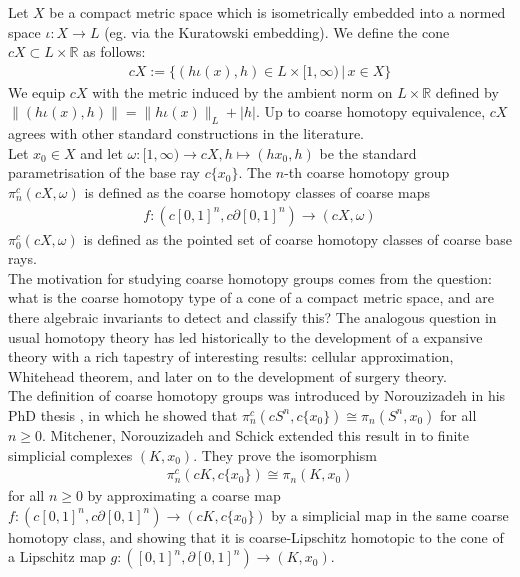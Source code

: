 \documentclass[a4paper,11pt]{article}
\theoremstyle{definition}
\theoremstyle{plain}
\theoremstyle{remark}
\begin{document}
Let $X$ be a compact metric space which is isometrically embedded into a normed space $\iota: X\rightarrow L$ (eg. via the Kuratowski embedding). We define the cone $cX \subset L \times \mathbb{R}$ as follows:
\begin{align*}
cX:= \{(h\iota(x),h)\in L \times [1,\infty) \,|\, x\in X\}
\end{align*}
We equip $cX$ with the metric induced by the ambient norm on $L\times \mathbb{R}$ defined by $\|(h\iota(x),h)\| = \|h\iota(x)\|_{L}+ |h|$.  Up to coarse homotopy equivalence, $cX$ agrees with other standard constructions in the literature. \\

Let $x_0\in X$ and let $\omega:[1,\infty)\rightarrow cX, h\mapsto  (hx_0,h)$ be the standard parametrisation of the base ray $c\{x_0\}$. The $n$-th coarse homotopy group $\pi_{n}^{c}(cX,\omega)$ is defined as the coarse homotopy classes of coarse maps 
\begin{align*}
f: (c[0,1]^n,c\partial [0,1]^n) \rightarrow (cX,\omega)
\end{align*}
$\pi_{0}^{c}(cX,\omega)$ is defined as the pointed set of coarse homotopy classes of coarse base rays.\\

The motivation for studying coarse homotopy groups comes from the question: what is the coarse homotopy type of a cone of a compact metric space, and are there algebraic invariants to detect and classify this? The analogous question in usual homotopy theory has led historically to the development of a expansive theory with a rich tapestry of interesting results: cellular approximation, Whitehead theorem, and later on to the development of surgery theory.\\

The definition of coarse homotopy groups was introduced by Norouzizadeh in his PhD thesis \cite{norouzizadeh2010some}, in which he showed that $\pi_{n}^{c}(cS^n,c\{x_0\}) \cong \pi_{n}(S^n,x_0)$ for all $n\geq 0$. Mitchener, Norouzizadeh and Schick extended this result in \cite{mitchener2020coarse} to finite simplicial complexes $(K,x_0)$. They prove the isomorphism 
\begin{align*}
\pi_{n}^{c}(cK,c\{x_0\})\cong \pi_{n}(K,x_0)
\end{align*}
for all $n\geq 0$ by approximating a coarse map $f: (c[0,1]^n,c\partial [0,1]^n)\rightarrow (cK,c\{x_0\})$ by a simplicial map in the same coarse homotopy class, and showing that it is coarse-Lipschitz homotopic to the cone of a Lipschitz map $g: ([0,1]^n,\partial [0,1]^n)\rightarrow (K,x_0)$. \\
\end{document}
